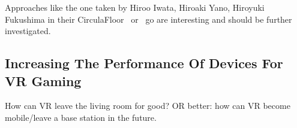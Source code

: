 Approaches like the one taken by Hiroo Iwata, Hiroaki Yano, Hiroyuki Fukushima in their CirculaFloor~\cite{Iwata:2005:CLI:1078037.1079777} or~\cite{Souman:2010:MVW:1670671.1670675} go are interesting and should be further investigated. 


\subsection{Increasing The Performance Of Devices For VR Gaming}
How can VR leave the living room for good? OR better: how can VR become mobile/leave a base station in the future.


